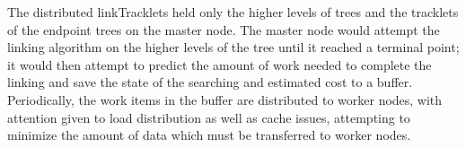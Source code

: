 The distributed linkTracklets held only the higher levels of trees and
the tracklets of the endpoint trees on the master node.  The master
node would attempt the linking algorithm on the higher levels of the
tree until it reached a terminal point; it would then attempt to
predict the amount of work needed to complete the linking and save the
state of the searching and estimated cost to a buffer.  Periodically,
the work items in the buffer are distributed to worker nodes, with
attention given to load distribution as well as cache issues,
attempting to minimize the amount of data which must be transferred to
worker nodes.


